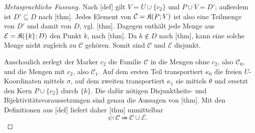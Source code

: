 \documentclass[main.tex]{subfiles}
\begin{document}
\pagebreak[2]
\begin{proof}[Metasprachliche Fassung]
Nach [def] gilt
\(V=U\cup\{c_2\}\) und \(P\cup V=D'\); außerdem ist
\(D'\subseteq D\) nach
[thm]. Jedes Element von
\(\mathcal C=\mathfrak K(P;V)\) ist also eine Teilmenge von \(D'\) und
damit von \(D\), vgl.
[thm]. Dagegen enthält jede
Menge aus \(\mathcal E=\mathfrak K(\{k\};D)\) den Punkt \(k\), nach
[thm]. Da \(k\notin D\) nach
[thm], kann
eine solche Menge nicht zugleich zu \(\mathcal C\) gehören. Somit sind
\(\mathcal C\) und \(\mathcal E\) disjunkt.

Anschaulich zerlegt der Marker \(c_2\) die Familie \(\mathcal C\) in
die Mengen ohne \(c_2\), also \(\mathcal C_0\), und die Mengen mit
\(c_2\), also \(\mathcal C_1\). Auf dem ersten Teil transportiert
\(\kappa_0\) die freien \(U\)-Koordinaten mittels \(\sigma\), auf dem
zweiten transportiert \(\kappa_1\) sie mittels \(\theta\) und ersetzt
den Kern \(P\cup\{c_2\}\) durch \(\{k\}\). Die dafür nötigen
Disjunktheits- und Bijektivitätsvoraussetzungen sind genau die Aussagen
von [thm].
Mit den Definitionen aus
[def] liefert daher
[thm] unmittelbar
\[
  \psi\colon\mathcal C\bij\mathcal C\cup\mathcal E.
\]
\end{proof}
\end{document}
